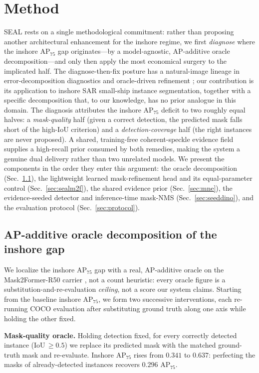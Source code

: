 \section{Method}
\label{sec:method}
SEAL rests on a single methodological commitment: rather than proposing another architectural enhancement for the inshore regime, we first \emph{diagnose} where the inshore AP$_{75}$ gap originates---by a model-agnostic, AP-additive oracle decomposition---and only then apply the most economical surgery to the implicated half. The diagnose-then-fix posture has a natural-image lineage in error-decomposition diagnostics and oracle-driven refinement \cite{tang2021bpr,kirillov2020pointrend}; our contribution is its application to inshore SAR small-ship instance segmentation, together with a specific decomposition that, to our knowledge, has no prior analogue in this domain. The diagnosis attributes the inshore AP$_{75}$ deficit to two roughly equal halves: a \emph{mask-quality} half (given a correct detection, the predicted mask falls short of the high-IoU criterion) and a \emph{detection-coverage} half (the right instances are never proposed). A shared, training-free coherent-speckle evidence field supplies a high-recall prior consumed by both remedies, making the system a genuine dual delivery rather than two unrelated models. We present the components in the order they enter this argument: the oracle decomposition (Sec.~\ref{sec:oracle}), the lightweight learned mask-refinement head and its equal-parameter control (Sec.~\ref{sec:sealm2f}), the shared evidence prior (Sec.~\ref{sec:mne}), the evidence-seeded detector and inference-time mask-NMS (Sec.~\ref{sec:seeddino}), and the evaluation protocol (Sec.~\ref{sec:protocol}).

\subsection{AP-additive oracle decomposition of the inshore gap}
\label{sec:oracle}
We localize the inshore AP$_{75}$ gap with a real, AP-additive oracle on the Mask2Former-R50 carrier \cite{cheng2022mask2former}, not a count heuristic: every oracle figure is a substitution-and-re-evaluation \emph{ceiling}, not a score our system claims. Starting from the baseline inshore AP$_{75}$, we form two successive interventions, each re-running COCO evaluation after substituting ground truth along one axis while holding the other fixed.

\textbf{Mask-quality oracle.} Holding detection fixed, for every correctly detected instance (IoU$\,\ge\!0.5$) we replace its predicted mask with the matched ground-truth mask and re-evaluate. Inshore AP$_{75}$ rises from $0.341$ to $0.637$: perfecting the masks of already-detected instances recovers $0.296$ AP$_{75}$.

